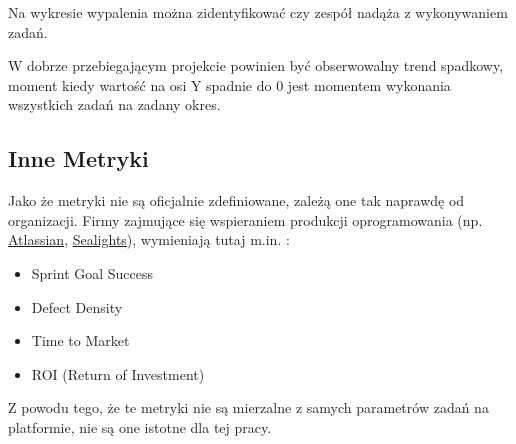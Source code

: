 Na wykresie wypalenia można zidentyfikować czy zespół nadąża z wykonywaniem zadań.

W dobrze przebiegającym projekcie powinien być obserwowalny trend spadkowy, moment kiedy wartość na osi Y spadnie do 0 jest momentem wykonania wszystkich zadań na zadany okres.

\subsection{Inne Metryki}
Jako że metryki nie są oficjalnie zdefiniowane, zależą one tak naprawdę od organizacji.
Firmy zajmujące się wspieraniem produkcji oprogramowania (np. \href{https://www.atlassian.com/}{Atlassian}, \href{https://www.sealights.io/}{Sealights}), wymieniają tutaj m.in. \cite{ScrumMetricsSealights} \cite{ScrumMetricsAtlassian}:
\begin{itemize}
    \item Sprint Goal Success
    \item Defect Density
    \item Time to Market
    \item ROI (Return of Investment)
\end{itemize}
Z powodu tego, że te metryki nie są mierzalne z samych parametrów zadań na platformie, nie są one istotne dla tej pracy.
